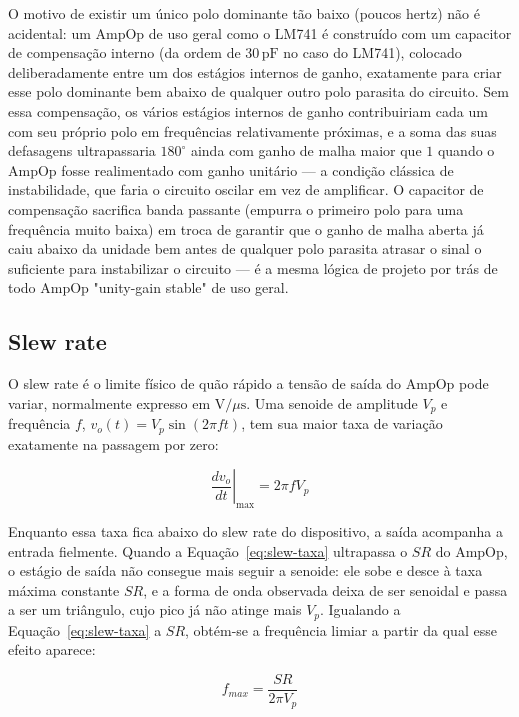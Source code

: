\documentclass[11pt,a4paper]{article}
\begin{document}
O motivo de existir um único polo dominante tão baixo (poucos hertz) não é acidental: um AmpOp de
uso geral como o LM741 é construído com um capacitor de compensação interno (da ordem de
\(30\,\text{pF}\) no caso do LM741), colocado deliberadamente entre um dos estágios internos de
ganho, exatamente para criar esse polo dominante bem abaixo de qualquer outro polo parasita do
circuito. Sem essa compensação, os vários estágios internos de ganho contribuiriam cada um com
seu próprio polo em frequências relativamente próximas, e a soma das suas defasagens ultrapassaria
\(180^\circ\) ainda com ganho de malha maior que \(1\) quando o AmpOp fosse realimentado com ganho
unitário — a condição clássica de instabilidade, que faria o circuito oscilar em vez de amplificar.
O capacitor de compensação sacrifica banda passante (empurra o primeiro polo para uma frequência
muito baixa) em troca de garantir que o ganho de malha aberta já caiu abaixo da unidade bem antes
de qualquer polo parasita atrasar o sinal o suficiente para instabilizar o circuito — é a mesma
lógica de projeto por trás de todo AmpOp "unity-gain stable" de uso geral.

\subsection{Slew rate}

O slew rate é o limite físico de quão rápido a tensão de saída do AmpOp pode variar,
normalmente expresso em \(\text{V}/\mu\text{s}\). Uma senoide de amplitude \(V_p\) e frequência
\(f\), \(v_o(t)=V_p\sin(2\pi ft)\), tem sua maior taxa de variação exatamente na passagem por
zero:

\begin{equation}
\left.\frac{dv_o}{dt}\right|_{\max} = 2\pi f V_p
\label{eq:slew-taxa}
\end{equation}

Enquanto essa taxa fica abaixo do slew rate do dispositivo, a saída acompanha a entrada
fielmente. Quando a Equação~\eqref{eq:slew-taxa} ultrapassa o \(SR\) do AmpOp, o estágio de saída
não consegue mais seguir a senoide: ele sobe e desce à taxa máxima constante \(SR\), e a forma de
onda observada deixa de ser senoidal e passa a ser um triângulo, cujo pico já não atinge mais
\(V_p\). Igualando a Equação~\eqref{eq:slew-taxa} a \(SR\), obtém-se a frequência limiar a partir
da qual esse efeito aparece:

\begin{equation}
f_{max} = \frac{SR}{2\pi V_p}
\label{eq:slew-fmax}
\end{equation}
\end{document}
